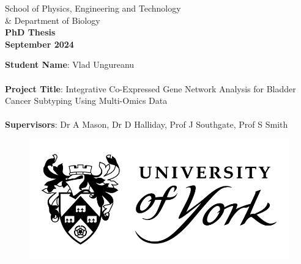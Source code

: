 \begin{titlepage} 
  \begin{center} 
    
    	\large School of Physics, Engineering and Technology \\ \& Department of Biology \\
        \vspace{2.0cm}
		\Huge \textbf{PhD Thesis} \\
        \vspace{0.2cm}
        \large \textbf{September 2024} \\

        \vspace{2.0cm}
            
       \begin{flushleft}
        \large \textbf{Student Name}: Vlad Ungureanu \\~\\
        \large \textbf{Project Title}: Integrative Co-Expressed Gene Network Analysis for Bladder Cancer Subtyping Using Multi-Omics Data \\~\\
        \large \textbf{Supervisors}: Dr A Mason, Dr D Halliday, Prof J Southgate, Prof S Smith
 
       \end{flushleft} 
            
           \begin{figure}[t]
          	\includegraphics[scale=0.45]{Images/UOY_logo.png}
          \end{figure}
                  
 \end{center} 

\end{titlepage}
